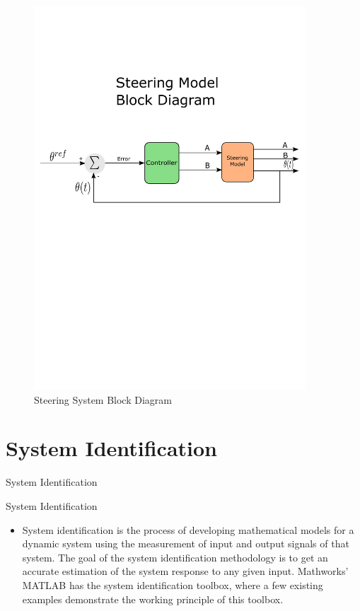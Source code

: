 \documentclass{beamer}
\begin{document}
\begin{frame}
\begin{figure}[h]
    \centering
    \captionsetup{justification=centering, margin=3cm}
    \includegraphics[width=4in]{figs/inkscape/steeringModelBlockDiagram}
    \caption{Steering System Block Diagram}
    \label{fig:steerBlockDiag}
\end{figure}
\end{frame}


\section{System Identification}

\begin{frame}{System Identification}
  \begin{block}{System Identification}
 \begin{itemize}
        \item System identification is the process of developing mathematical models for a dynamic system using the measurement of input and output signals of that system. The goal of the system identification methodology is to get an accurate estimation of the system response to any given input. Mathworks' MATLAB has the system identification toolbox, where a few existing examples demonstrate the working principle of this toolbox.
\end{itemize}
  \end{block}
\end{frame}
\end{document}
